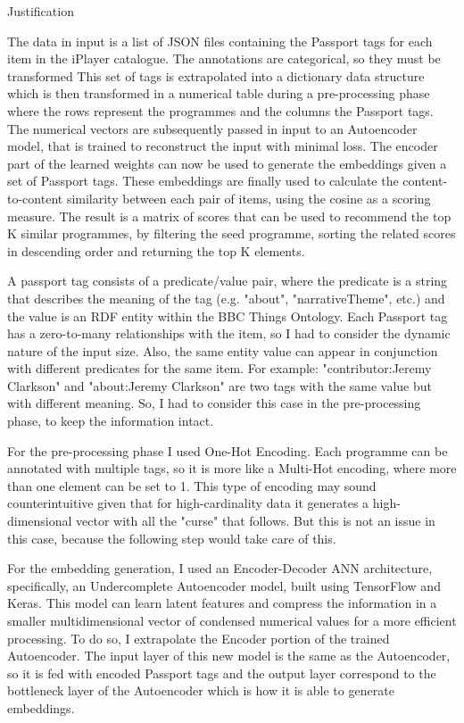 Justification


The data in input is a list of JSON files containing the Passport tags for each item in the iPlayer catalogue. The annotations
are categorical, so they must be transformed
This set of tags is extrapolated into a dictionary data structure which is then transformed in a numerical table during a pre-processing phase where the rows represent the programmes and the columns the Passport tags. The numerical vectors are subsequently passed in input to an Autoencoder model, that is trained to reconstruct the input with minimal loss. The encoder part of the learned weights can now be used to generate the embeddings given a set of Passport tags. These embeddings are finally used to calculate the content-to-content similarity between each pair of items, using the cosine as a scoring measure. The result is a matrix of scores that can be used to recommend the top K similar programmes, by filtering the seed programme, sorting the related scores in descending order and returning the top K elements.

A passport tag consists of a predicate/value pair, where the predicate is a string that describes the meaning of the tag (e.g. "about", "narrativeTheme",  etc.) and the value is an RDF entity within the BBC Things Ontology. Each Passport tag has a zero-to-many relationships with the item, so I had to consider the dynamic nature of the input size. Also, the same entity value can appear in conjunction with different predicates for the same item. For example: "contributor:Jeremy Clarkson" and "about:Jeremy Clarkson" are two tags with the same value but with different meaning. So, I had to consider this case in the pre-processing phase, to keep the information intact.

For the pre-processing phase I used One-Hot Encoding. Each programme can be annotated with multiple tags, so it is more like a Multi-Hot encoding, where more than one element can be set to 1. This type of encoding may sound counterintuitive given that for high-cardinality data it generates a high-dimensional vector with all the "curse" that follows. But this is not an issue in this case, because the following step would take care of this.

For the embedding generation, I used an Encoder-Decoder ANN architecture, specifically, an Undercomplete Autoencoder model, built using TensorFlow and Keras. This model can learn latent features and compress the information in a smaller multidimensional vector of condensed numerical values for a more efficient processing. To do so, I extrapolate the Encoder portion of the trained Autoencoder. The input layer of this new model is the same as the Autoencoder, so it is fed with encoded Passport tags and the output layer correspond to the bottleneck layer of the Autoencoder which is how it is able to generate embeddings.

